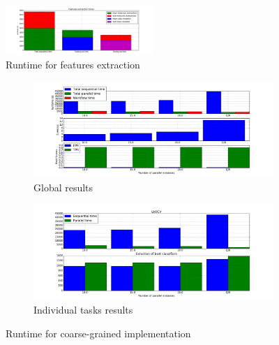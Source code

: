 \documentclass[10pt, conference, compsocconf]{IEEEtran}
\begin{document}
\begin{figure}[h]
  \centering
  \includegraphics[width=0.5\textwidth]{Figures/times_extraction.png}
  \caption{Runtime for features extraction \label{fig:times_extraction}}
\end{figure}

\begin{figure}[h]
  \begin{center}
    \begin{subfigure}{0.5\textwidth}
      \centering
      \includegraphics[width=\textwidth]{Figures/times_fixedparams_global_bars.png}
      \caption{\footnotesize Global results \label{subfig:granularity_glob}}
  \end{subfigure}
  \begin{subfigure}{0.5\textwidth}
    \centering
    \includegraphics[width=\textwidth]{Figures/times_fixedparams_individual_bars.png}
    \caption{\footnotesize Individual tasks results \label{subfig:granularity_ind}}
  \end{subfigure}
\end{center}
\caption{Runtime for coarse-grained implementation \label{fig:granularity}}
\end{figure}
\end{document}
